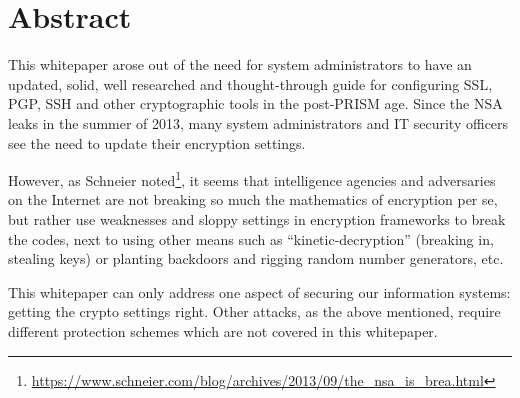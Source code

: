 \section*{Abstract}

This whitepaper arose out of the need for system administrators to have an
updated, solid, well researched and thought-through guide for configuring SSL,
PGP, SSH and other cryptographic tools in the post-PRISM age.  Since the NSA
leaks in the summer of 2013, many system administrators and IT security
officers see the need to update their encryption settings.

However, as Schneier
noted\footnote{\url{https://www.schneier.com/blog/archives/2013/09/the\_nsa\_is\_brea.html}},
it seems that intelligence agencies and adversaries on the Internet are not
breaking so much the mathematics of encryption per se, but rather use
weaknesses and sloppy settings in encryption frameworks to break the codes,
next to using other means such as ``kinetic-decryption'' (breaking in, stealing
keys) or planting backdoors and rigging random number generators, etc.

This whitepaper can only address one aspect of securing our
information systems: getting the crypto settings right. Other attacks, as the
above mentioned, require different protection schemes which are not covered in
this whitepaper. 


